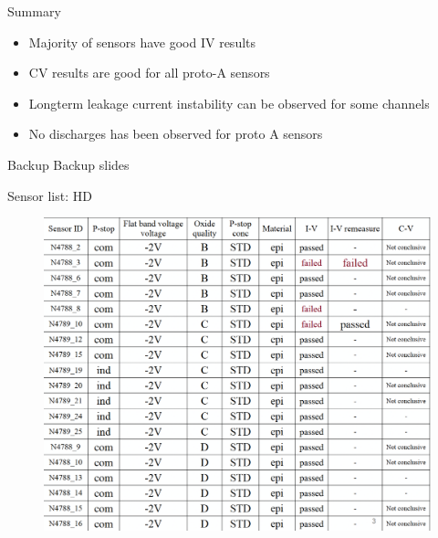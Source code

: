\documentclass{beamer}
\begin{document}
\begin{frame}{Summary}
  \begin{itemize}
    \item Majority of sensors have good IV results
    \item CV results are good for all proto-A sensors
    \item Longterm leakage current instability can be observed  for some channels
    \item No discharges has been observed for proto A sensors
  \end{itemize}
\end{frame}

\appendix

\begin{frame}{Backup}
	\center
	\huge
	Backup slides
\end{frame}

\begin{frame}{Sensor list: HD}
   \begin{figure}
       \includegraphics[width=.8\textwidth]{plots/PM8_sensorList.png}
   \end{figure} 
\end{frame}
\end{document}
